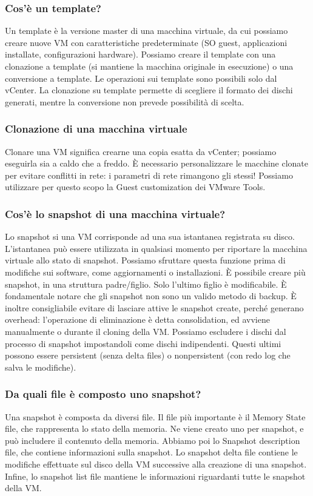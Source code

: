 \documentclass[11pt]{article}
\begin{document}
\subsubsection{Cos'è un template?}
Un template è la versione master di una macchina virtuale, da cui possiamo creare nuove VM con caratteristiche predeterminate (SO guest, applicazioni installate, configurazioni hardware). Possiamo creare il template con una clonazione a template (si mantiene la macchina originale in esecuzione) o una conversione a template. Le operazioni sui template sono possibili solo dal vCenter. La clonazione su template permette di scegliere il formato dei dischi generati, mentre la conversione non prevede possibilità di scelta. 

\subsubsection{Clonazione di una macchina virtuale}
Clonare una VM significa crearne una copia esatta da vCenter; possiamo eseguirla sia a caldo che a freddo. È necessario personalizzare le macchine clonate per evitare conflitti in rete: i parametri di rete rimangono gli stessi! Possiamo utilizzare per questo scopo la Guest customization dei VMware Tools. 

\subsubsection{Cos'è lo snapshot di una macchina virtuale?}
Lo snapshot si una VM corrisponde ad una sua istantanea registrata su disco. L'istantanea può essere utilizzata in qualsiasi momento per riportare la macchina virtuale allo stato di snapshot. Possiamo sfruttare questa funzione prima di modifiche sui software, come aggiornamenti o installazioni. È possibile creare più snapshot, in una struttura padre/figlio. Solo l'ultimo figlio è modificabile. È fondamentale notare che gli snapshot non sono un valido metodo di backup. È inoltre consigliabile evitare di lasciare attive le snapshot create, perché generano overhead: l'operazione di eliminazione è detta consolidation, ed avviene manualmente o durante il cloning della VM. Possiamo escludere i dischi dal processo di snapshot impostandoli come dischi indipendenti. Questi ultimi possono essere persistent (senza delta files) o nonpersistent (con redo log che salva le modifiche). 

\subsubsection{Da quali file è composto uno snapshot?}
Una snapshot è composta da diversi file. Il file più importante è il Memory State file, che rappresenta lo stato della memoria. Ne viene creato uno per snapshot, e può includere il contenuto della memoria. Abbiamo poi lo Snapshot description file, che contiene informazioni sulla snapshot. Lo snapshot delta file contiene le modifiche effettuate sul disco della VM successive alla creazione di una snapshot. Infine, lo snapshot list file mantiene le informazioni riguardanti tutte le snapshot della VM.
\end{document}
